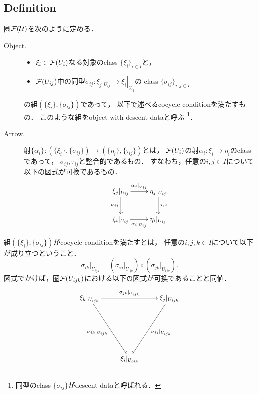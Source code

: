 \documentclass[a4paper]{jsarticle}
\newcommand{\mnewline}{\mbox{}\newline}
\begin{document}
\subsection{Definition}
\begin{Def}
    圏$\mathcal{F}(\mathcal{U})$を次のように定める．
    \begin{description}
        \item[Object.] \hfill \vspace{-0.2cm}
            \begin{itemize}
                \item $\xi_i \in \mathcal{F}(U_i)$なる対象のclass $\{\xi_i\}_{i \in I}$と，
                \item
                    $\mathcal{F}(U_{ij})$中の同型$\sigma_{ij} \colon \xi_j|_{U_{ij}} \to \xi_i|_{U_{ij}}$の
                    class $\{\sigma_{ij}\}_{i,j \in I}$
            \end{itemize}
            の組$(\{\xi_i\}, \{\sigma_{ij}\})$であって，
            以下で述べるcocycle conditionを満たすもの．
            このような組をobject with descent dataと呼ぶ
            \footnote{ 同型のclass $\{\sigma_{ij}\}$がdescent dataと呼ばれる． }．

        \item[Arrow.] \mnewline
            射$\{\alpha_i\} \colon (\{\xi_i\}, \{\sigma_{ij}\}) \to (\{\eta_i\}, \{\tau_{ij}\})$とは，
            $\mathcal{F}(U_i)$の射$\alpha_i \colon \xi_i \to \eta_i$のclassであって，\mnewline
            $\sigma_{ij}, \tau_{ij}$と整合的であるもの．
            すなわち，任意の$i, j \in I$について以下の図式が可換であるもの．
            \[\xymatrix{
                \ar[d]_-{\sigma_{ij}} \xi_j|_{U_{ij}} \ar[r]^-{\alpha_j|_{U_{ij}}}&
                \eta_j|_{U_{ij}} \ar[d]^-{\tau_{ij}}\\
                 \xi_i|_{U_{ij}} \ar[r]_-{\alpha_i|_{U_{ij}}}& \eta_i|_{U_{ij}}
            }\]
    \end{description}

    組$(\{\xi_i\}, \{\sigma_{ij}\})$がcocycle conditionを満たすとは，
    任意の$i,j,k \in I$について以下が成り立つということ．
    \[ \sigma_{ik}|_{U_{ijk}}=(\sigma_{ij}|_{U_{ijk}}) \circ (\sigma_{jk}|_{U_{ijk}}). \]
    図式でかけば，圏$\mathcal{F}(U_{ijk})$における以下の図式が可換であることと同値．
    \[\xymatrix@R=70pt{
         \xi_k|_{U_{ijk}} \ar[rd]_-{\sigma_{ik}|_{U_{ijk}}} \ar[rr]^-{\sigma_{jk}|_{U_{ijk}}}
            & {}
            & \xi_j|_{U_{ijk}} \ar[ld]^-{\sigma_{ij}|_{U_{ijk}}} \\
        {} & \xi_i|_{U_{ijk}} & {}
    }\]
\end{Def}
\end{document}
